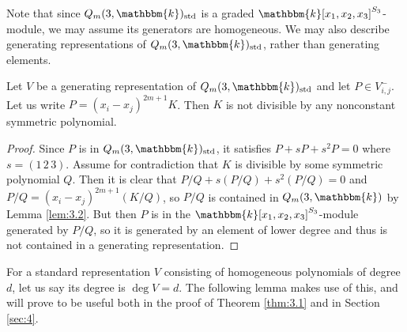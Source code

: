 \documentclass[11pt]{article}
\numberwithin{equation}{section}
\theoremstyle{definition}
\numberwithin{equation}{section}
\renewcommand{\k}{\mathbbm{k}}
\newcommand{\std}{\mathrm{std}}
\begin{document}
Note that since $Q_m(3,\k)_\std$ is a graded $\k[x_1,x_2,x_3]^{S_3}$-module, we may assume its generators are homogeneous. We may also describe generating representations of $Q_m(3,\k)_\std$, rather than generating elements. 

\begin{corollary}\label{cor:3.3}
    Let $V$ be a generating representation of $Q_m(3,\k)_\std$ and let $P\in V_{i,j}^-$. Let us write $P=(x_i-x_j)^{2m+1}K$. Then $K$ is not divisible by any nonconstant symmetric polynomial.
\end{corollary}
\begin{proof}
    Since $P$ is in $Q_m(3,\k)_\std$, it satisfies $P+sP+s^2P=0$ where $s=(1\,2\,3)$. Assume for contradiction that $K$ is divisible by some symmetric polynomial $Q$. Then it is clear that \linebreak
    $P/Q+s(P/Q)+s^2(P/Q)=0$ and $P/Q=(x_i-x_j)^{2m+1}(K/Q)$, so $P/Q$ is contained in $Q_m(3,\k)$ by Lemma \ref{lem:3.2}. But then $P$ is in the $\k[x_1,x_2,x_3]^{S_3}$-module generated by $P/Q$, so it is generated by an element of lower degree and thus is not contained in a generating representation.
\end{proof}

For a standard representation $V$ consisting of homogeneous polynomials of degree $d$, let us say its degree is $\deg V=d$. The following lemma makes use of this, and will prove to be useful both in the proof of Theorem \ref{thm:3.1} and in Section \ref{sec:4}.
\end{document}
